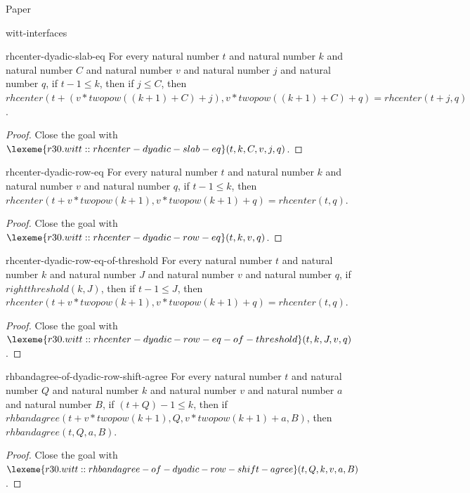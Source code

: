 \begin{lexlean}{Paper}
\begin{section}{witt-interfaces}
  \begin{theorem}{rhcenter-dyadic-slab-eq}
  For every natural number \(t\) and natural number \(k\) and natural number \(C\) and natural number \(v\) and natural number \(j\) and natural number \(q\), if \(t - 1 ≤ k\), then if \(j ≤ C\), then \(rhcenter(t + (v * twopow((k + 1) + C) + j), v * twopow((k + 1) + C) + q) = rhcenter(t + j, q)\).
  \begin{proof}
  Close the goal with \(\lexeme{r30.witt::rhcenter-dyadic-slab-eq}(t, k, C, v, j, q)\).
  \end{proof}
  \end{theorem}

  \begin{theorem}{rhcenter-dyadic-row-eq}
  For every natural number \(t\) and natural number \(k\) and natural number \(v\) and natural number \(q\), if \(t - 1 ≤ k\), then \(rhcenter(t + v * twopow(k + 1), v * twopow(k + 1) + q) = rhcenter(t, q)\).
  \begin{proof}
  Close the goal with \(\lexeme{r30.witt::rhcenter-dyadic-row-eq}(t, k, v, q)\).
  \end{proof}
  \end{theorem}

  \begin{theorem}{rhcenter-dyadic-row-eq-of-threshold}
  For every natural number \(t\) and natural number \(k\) and natural number \(J\) and natural number \(v\) and natural number \(q\), if \(rightthreshold(k, J)\), then if \(t - 1 ≤ J\), then \(rhcenter(t + v * twopow(k + 1), v * twopow(k + 1) + q) = rhcenter(t, q)\).
  \begin{proof}
  Close the goal with \(\lexeme{r30.witt::rhcenter-dyadic-row-eq-of-threshold}(t, k, J, v, q)\).
  \end{proof}
  \end{theorem}

  \begin{theorem}{rhbandagree-of-dyadic-row-shift-agree}
  For every natural number \(t\) and natural number \(Q\) and natural number \(k\) and natural number \(v\) and natural number \(a\) and natural number \(B\), if \((t + Q) - 1 ≤ k\), then if \(rhbandagree(t + v * twopow(k + 1), Q, v * twopow(k + 1) + a, B)\), then \(rhbandagree(t, Q, a, B)\).
  \begin{proof}
  Close the goal with \(\lexeme{r30.witt::rhbandagree-of-dyadic-row-shift-agree}(t, Q, k, v, a, B)\).
  \end{proof}
  \end{theorem}


\end{section}
\end{lexlean}
